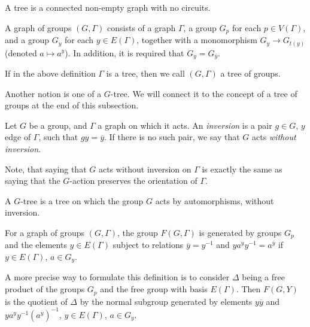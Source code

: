 \begin{definition} 
    A tree is a connected non-empty graph with no circuits.
\end{definition}

\begin{definition}\label{grpgraph}
    A graph of groups $(G,\Gamma)$ consists of a graph $\Gamma$, a group $G_p$ for each $p \in V(\Gamma)$, and a group $G_y$ for each $y \in E(\Gamma)$, together with a monomorphism $G_y \to G_{t(y)}$ (denoted $a \mapsto a^y$). In addition, it is required that $G_y = G_{\overline{y}}$.
\end{definition}

If in the above definition $\Gamma$ is a tree, then we call $(G,\Gamma)$ a tree of groups.

Another notion is one of a $G$-tree. We will connect it to the concept of a tree of groups at the end of this subsection.

\begin{definition}
\label{def:graph_of_groups_action_without_inversion}
    Let $G$ be a group, and $\Gamma$ a graph on which it acts. An \emph{inversion} is a pair $g \in G$, $y$ edge of $\Gamma$, such that $gy = \overline{y}$. If there is no such pair, we say that $G$ acts \emph{without inversion}. 
\end{definition}

Note, that saying that $G$ acts without inversion on $\Gamma$ is exactly the same as saying that the $G$-action preserves the orientation of $\Gamma$.

\begin{definition}
    A $G$-tree is a tree on which the group $G$ acts by automorphisms, without inversion.
\end{definition}

\begin{definition}
    For a graph of groups $(G,\Gamma)$, the group $F(G,\Gamma)$ is generated by groups $G_p$ and the elements $y \in E(\Gamma)$ subject to relations $\overline{y} = y^{-1}$ and $ya^yy^{-1} = a^{\overline{y}}$ if $y \in E(\Gamma)$, $a \in G_y$.
\end{definition}

A more precise way to formulate this definition is to consider $\Delta$ being a free product of the groups $G_p$ and the free group with basis $E(\Gamma)$. Then $F(G,Y)$ is the quotient of $\Delta$ by the normal subgroup generated by elements $y\overline{y}$ and $ya^yy^{-1}(a^{\overline{y}})^{-1}$, $y \in E(\Gamma)$, $a \in G_y$.

